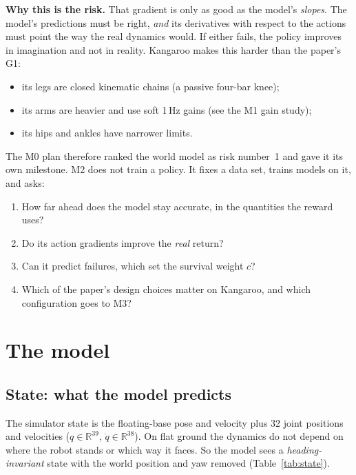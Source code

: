 \documentclass[10pt]{article}
\newcommand{\tab}[1]{Table~\ref{#1}}
\begin{document}
\textbf{Why this is the risk.} That gradient is only as good as the model's \emph{slopes}. The model's
predictions must be right, \emph{and} its derivatives with respect to the actions must point the way
the real dynamics would. If either fails, the policy improves in imagination and not in reality.
Kangaroo makes this harder than the paper's G1:
\begin{itemize}
  \item its legs are closed kinematic chains (a passive four-bar knee);
  \item its arms are heavier and use soft 1\,Hz gains (see the M1 gain study);
  \item its hips and ankles have narrower limits.
\end{itemize}
The M0 plan therefore ranked the world model as risk number~1 and gave it its own milestone. M2 does
not train a policy. It fixes a data set, trains models on it, and asks:
\begin{enumerate}[label=\textbf{Q\arabic*}]
  \item How far ahead does the model stay accurate, in the quantities the reward uses?
  \item Do its action gradients improve the \emph{real} return?
  \item Can it predict failures, which set the survival weight $c$?
  \item Which of the paper's design choices matter on Kangaroo, and which configuration goes to M3?
\end{enumerate}

\section{The model}

\subsection{State: what the model predicts}

The simulator state is the floating-base pose and velocity plus 32 joint positions and velocities
($q \in \mathbb R^{39}$, $\dot q \in \mathbb R^{38}$). On flat ground the dynamics do not depend on
where the robot stands or which way it faces. So the model sees a \emph{heading-invariant} state with
the world position and yaw removed (\tab{tab:state}).
\end{document}
